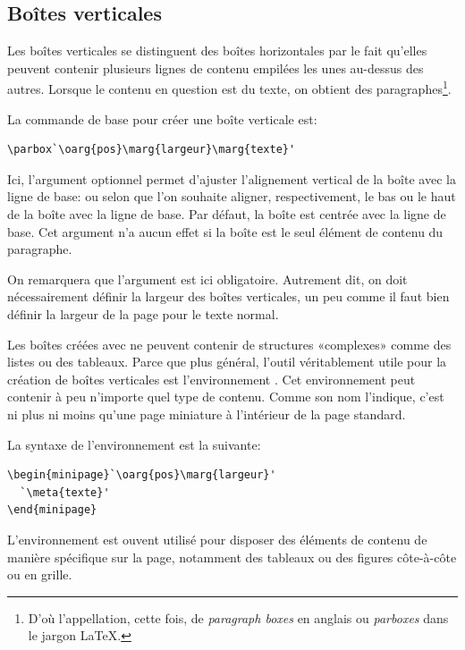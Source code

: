 \subsection{Boîtes verticales}
\label{sec:tableaux:boites:parbox}

Les boîtes verticales se distinguent des boîtes horizontales par le
fait qu'elles peuvent contenir plusieurs lignes de contenu empilées
les unes au-dessus des autres. Lorsque le contenu en question est du
texte, on obtient des paragraphes\footnote{%
  D'où l'appellation, cette fois, de \emph{paragraph boxes} en anglais
  ou \emph{parboxes} dans le jargon {\LaTeX}.}. %

La commande de base pour créer une boîte verticale est:
\begin{lstlisting}
\parbox`\oarg{pos}\marg{largeur}\marg{texte}'
\end{lstlisting}
Ici, l'argument optionnel  permet d'ajuster l'alignement
vertical de la boîte avec la ligne de base:  ou  selon
que l'on souhaite aligner, respectivement, le bas ou le haut de la
boîte avec la ligne de base. Par défaut, la boîte est centrée avec la
ligne de base. Cet argument n'a aucun effet si la boîte est le seul
élément de contenu du paragraphe.

On remarquera que l'argument  est ici obligatoire.
Autrement dit, on doit nécessairement définir la largeur des boîtes
verticales, un peu comme il faut bien définir la largeur de la page
pour le texte normal.

Les boîtes créées avec \cmd{\parbox} ne peuvent contenir de structures
«complexes» comme des listes ou des tableaux. Parce que plus général,
l'outil véritablement utile pour la création de boîtes verticales est
l'environnement . Cet environnement peut contenir à peu
n'importe quel type de contenu. Comme son nom l'indique, c'est ni plus
ni moins qu'une page miniature à l'intérieur de la page standard.

La syntaxe de l'environnement  est la suivante:
\begin{lstlisting}
\begin{minipage}`\oarg{pos}\marg{largeur}'
  `\meta{texte}'
\end{minipage}
\end{lstlisting}

L'environnement  est ouvent utilisé pour disposer des
éléments de contenu de manière spécifique sur la page, notamment des
tableaux ou des figures côte-à-côte ou en grille.

